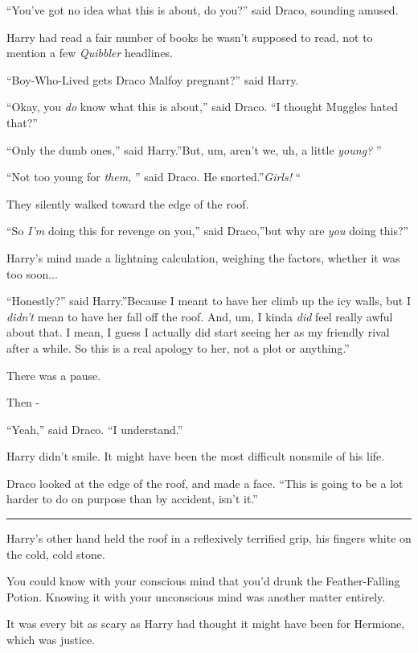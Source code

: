 ``You've got no idea what this is about, do you?'' said Draco, sounding
amused.

Harry had read a fair number of books he wasn't supposed to read, not to
mention a few \emph{Quibbler} headlines.

``Boy-Who-Lived gets Draco Malfoy pregnant?'' said Harry.

``Okay, you \emph{do} know what this is about,'' said Draco. ``I thought
Muggles hated that?''

``Only the dumb ones,'' said Harry.''But, um, aren't we, uh, a little
\emph{young?} ''

``Not too young for \emph{them,} '' said Draco. He snorted.''\emph{Girls!}
``

They silently walked toward the edge of the roof.

``So \emph{I'm} doing this for revenge on you,'' said Draco,''but why are
\emph{you} doing this?''

Harry's mind made a lightning calculation, weighing the factors, whether
it was too soon...

``Honestly?'' said Harry.''Because I meant to have her climb up the icy
walls, but I \emph{didn't} mean to have her fall off the roof. And, um,
I kinda \emph{did} feel really awful about that. I mean, I guess I
actually did start seeing her as my friendly rival after a while. So
this is a real apology to her, not a plot or anything.''

There was a pause.

Then -

``Yeah,'' said Draco. ``I understand.''

Harry didn't smile. It might have been the most difficult nonsmile of
his life.

Draco looked at the edge of the roof, and made a face. ``This is going
to be a lot harder to do on purpose than by accident, isn't it.''

\begin{center}\rule{3in}{0.4pt}\end{center}

Harry's other hand held the roof in a reflexively terrified grip, his
fingers white on the cold, cold stone.

You could know with your conscious mind that you'd drunk the
Feather-Falling Potion. Knowing it with your unconscious mind was
another matter entirely.

It was every bit as scary as Harry had thought it might have been for
Hermione, which was justice.

